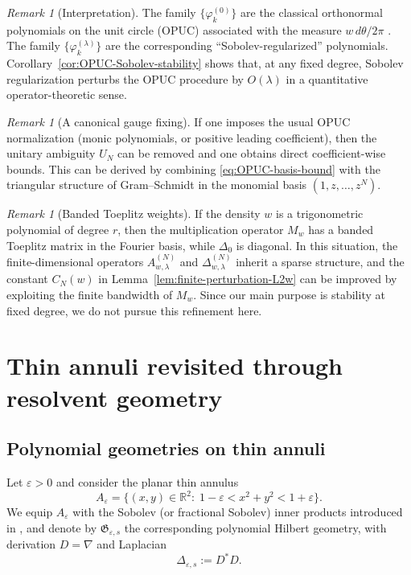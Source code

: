 \documentclass{amsart}
\numberwithin{equation}{section}
\theoremstyle{definition}
\theoremstyle{remark}
\newtheorem{remark}[theorem]{Remark}
\begin{document}
\begin{remark}[Interpretation]
The family $\{\varphi_k^{(0)}\}$ are the classical orthonormal polynomials on the unit circle
(OPUC) associated with the measure $w\,d\theta/2\pi$ \cite{SimonOPUC1}.
The family $\{\varphi_k^{(\lambda)}\}$ are the corresponding ``Sobolev-regularized'' polynomials.
Corollary~\ref{cor:OPUC-Sobolev-stability} shows that, at any fixed degree, Sobolev regularization
perturbs the OPUC procedure by $O(\lambda)$ in a quantitative operator-theoretic sense.
\end{remark}

\begin{remark}[A canonical gauge fixing]
If one imposes the usual OPUC normalization (monic polynomials, or positive leading coefficient),
then the unitary ambiguity $U_N$ can be removed and one obtains direct coefficient-wise bounds.
This can be derived by combining \eqref{eq:OPUC-basis-bound} with the triangular structure of
Gram--Schmidt in the monomial basis $(1,z,\dots,z^N)$.
\end{remark}

\begin{remark}[Banded Toeplitz weights]
\label{rem:Toeplitz-banded}
If the density $w$ is a trigonometric polynomial of degree $r$, then the multiplication operator
$M_w$ has a banded Toeplitz matrix in the Fourier basis, while $\Delta_0$ is diagonal.
In this situation, the finite-dimensional operators $A_{w,\lambda}^{(N)}$ and
$\Delta_{w,\lambda}^{(N)}$ inherit a sparse structure, and the constant $C_N(w)$
in Lemma~\ref{lem:finite-perturbation-L2w} can be improved by exploiting the finite bandwidth
of $M_w$.
Since our main purpose is stability at fixed degree, we do not pursue this refinement here.
\end{remark}


\section{Thin annuli revisited through resolvent geometry}
\label{sec:thin-annuli}

\subsection{Polynomial geometries on thin annuli}

Let $\varepsilon>0$ and consider the planar thin annulus
\[
A_\varepsilon=\bigl\{(x,y)\in\mathbb R^2:\;1-\varepsilon < x^2+y^2 < 1+\varepsilon\bigr\}.
\]
We equip $A_\varepsilon$ with the Sobolev (or fractional Sobolev) inner products introduced in
\cite{MagnotThinAnnuli}, and denote by $\mathfrak G_{\varepsilon,s}$ the corresponding polynomial
Hilbert geometry, with derivation $D=\nabla$ and Laplacian
\[
\Delta_{\varepsilon,s}:=D^*D.
\]
\end{document}
